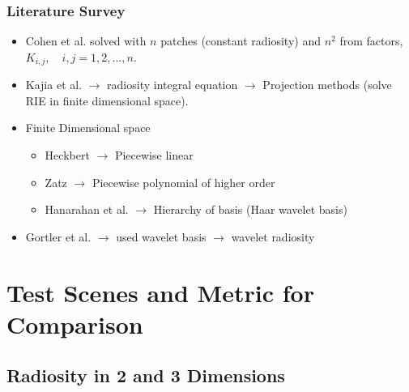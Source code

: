       \begin{frame}\frametitle{Literature Survey}

      \begin{itemize}
      \item Cohen et al. solved with $n$ patches (constant radiosity) and $n^2$ from factors, $K_{i,j}, \quad i,j =1,2,...,n.$

      \item Kajia et al. $\rightarrow$ radiosity integral equation $\rightarrow$ Projection methods (solve RIE in finite dimensional space).

      \item Finite Dimensional space
          \begin{itemize}
          \item Heckbert $\rightarrow$ Piecewise linear 
          \item Zatz $\rightarrow$ Piecewise polynomial of higher order
          \item Hanarahan et al. $\rightarrow$ Hierarchy of basis (Haar wavelet basis)
          \end{itemize}

      \item Gortler et al. $\rightarrow$ used wavelet basis $\rightarrow$ wavelet radiosity

      \end{itemize}
      \end{frame}


\section{Test Scenes and Metric for Comparison}
  \subsection{Radiosity in 2 and 3 Dimensions}


